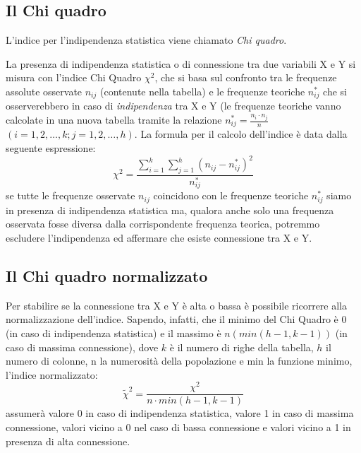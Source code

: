 \subsection{Il Chi quadro}

L'indice per l'indipendenza statistica viene chiamato \emph{Chi quadro}.

La presenza di indipendenza statistica o di connessione tra due variabili X 
e Y si misura con l'indice Chi Quadro $\chi^2$, che si basa sul confronto 
tra le frequenze assolute osservate  $n_{ij}$ (contenute nella tabella) e 
le frequenze teoriche $n^*_{ij}$ che si osserverebbero in caso di 
\emph{indipendenza} tra X e Y (le frequenze teoriche vanno calcolate 
in una nuova tabella  tramite la relazione $n^*_{ij}=\frac{n_i\cdot 
n_j}{n}$ $(i=1,2,\dots,k; j=1,2,\dots,h)$. La formula per il calcolo 
dell'indice è data dalla seguente espressione: 
$$\chi^2=\frac{\sum_{i=1}^{k}\sum_{j=1}^{h}\left( n_{ij}-n^*_{ij}\right) 
^2}{n^*_{ij}}$$
se tutte le frequenze osservate $n_{ij}$ coincidono con le frequenze 
teoriche $n^*_{ij}$ siamo in presenza di indipendenza statistica ma, 
qualora anche solo una frequenza osservata fosse diversa dalla 
corrispondente frequenza teorica, potremmo escludere l'indipendenza ed 
affermare che esiste connessione tra X e Y.

\subsection{Il Chi quadro normalizzato}

 Per stabilire se la connessione tra X e Y è alta o bassa è possibile 
ricorrere alla normalizzazione dell'indice. Sapendo, infatti, che il minimo 
del Chi Quadro è 0 (in caso di indipendenza statistica) e il massimo è 
$n(min(h-1,k-1))$  (in caso di massima connessione), dove $k$ è il numero 
di righe della tabella, $h$ il numero di colonne, n la numerosità della 
popolazione e min la funzione minimo, l'indice normalizzato:
 $$\widetilde{\chi}^2=\frac{\chi^2}{n\cdot min(h-1,k-1)}$$
 assumerà valore 0 in caso di indipendenza statistica, valore 1 in caso di 
massima connessione, valori vicino a 0 nel caso di bassa connessione e 
valori vicino a 1 in presenza di alta connessione.

